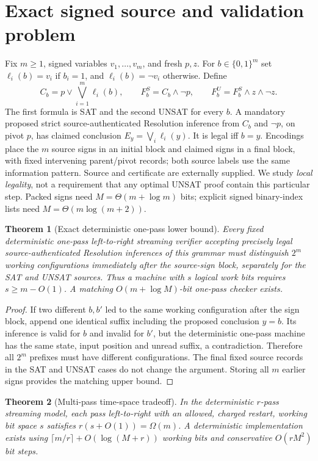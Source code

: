 \documentclass[11pt]{article}
\newtheorem{theorem}{Theorem}
\begin{document}
\section*{Exact signed source and validation problem}
Fix $m\ge1$, signed variables $v_1,\ldots,v_m$, and fresh $p,z$. For $b\in\{0,1\}^m$ set $\ell_i(b)=v_i$ if $b_i=1$, and $\ell_i(b)=\neg v_i$ otherwise. Define
\[
C_b=p\vee\bigvee_{i=1}^{m}\ell_i(b),\qquad
F_b^S=C_b\wedge\neg p,\qquad
F_b^U=F_b^S\wedge z\wedge\neg z.
\]
The first formula is SAT and the second UNSAT for every $b$. A mandatory proposed strict source-authenticated Resolution inference from $C_b$ and $\neg p$, on pivot $p$, has claimed conclusion $E_y=\bigvee_i\ell_i(y)$. It is legal iff $b=y$. Encodings place the $m$ source signs in an initial block and claimed signs in a final block, with fixed intervening parent/pivot records; both source labels use the same information pattern. Source and certificate are externally supplied. We study \emph{local legality}, not a requirement that any optimal UNSAT proof contain this particular step. Packed signs need $M=\Theta(m+\log m)$ bits; explicit signed binary-index lists need $M=\Theta(m\log(m+2))$.
\begin{theorem}[Exact deterministic one-pass lower bound]
Every fixed deterministic one-pass left-to-right streaming verifier accepting precisely legal source-authenticated Resolution inferences of this grammar must distinguish $2^m$ working configurations immediately after the source-sign block, separately for the SAT and UNSAT sources. Thus a machine with $s$ logical work bits requires $s\ge m-O(1)$. A matching $O(m+\log M)$-bit one-pass checker exists.
\end{theorem}
\begin{proof}
If two different $b,b'$ led to the same working configuration after the sign block, append one identical suffix including the proposed conclusion $y=b$. Its inference is valid for $b$ and invalid for $b'$, but the deterministic one-pass machine has the same state, input position and unread suffix, a contradiction. Therefore all $2^m$ prefixes must have different configurations. The final fixed source records in the SAT and UNSAT cases do not change the argument. Storing all $m$ earlier signs provides the matching upper bound.
\end{proof}
\begin{theorem}[Multi-pass time-space tradeoff]
In the deterministic $r$-pass streaming model, each pass left-to-right with an allowed, charged restart, working bit space $s$ satisfies $r(s+O(1))=\Omega(m)$. A deterministic implementation exists using $\lceil m/r\rceil+O(\log(M+r))$ working bits and conservative $O(rM^2)$ bit steps.
\end{theorem}
\end{document}
